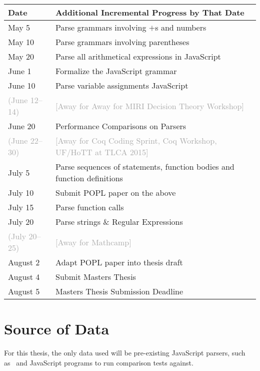 \documentclass{article}
\begin{document}
  \newcommand{\away}[1]{\textcolor{darkgray}{#1}}%
  \newcommand{\awayd}[1]{\away{(#1)}}%
  \newcommand{\awayb}[1]{\away{[Away for #1]}}%
  \begin{center}
  \begin{tabular}{l|l}
  Date & Additional Incremental Progress by That Date \\ \hline
  May 5 & Parse grammars involving $+$s and numbers \\
  May 10 & Parse grammars involving parentheses \\
  May 20 & Parse all arithmetical expressions in JavaScript \\
  June 1 & Formalize the JavaScript grammar \\
  June 10 & Parse variable assignments JavaScript \\
  \awayd{June 12--14} & \awayb{Away for MIRI Decision Theory Workshop} \\
  June 20 & Performance Comparisons on Parsers \\
  \awayd{June 22--30} & \awayb{Coq Coding Sprint, Coq Workshop, UF/HoTT at TLCA 2015} \\
  July 5 & Parse sequences of statements, function bodies and function definitions \\
  July 10 & Submit POPL paper on the above \\
  July 15 & Parse function calls \\
  July 20 & Parse strings \& Regular Expressions \\
  \awayd{July 20--25} & \awayb{Mathcamp} \\
  August 2 & Adapt POPL paper into thesis draft \\
  August 4 & Submit Masters Thesis \\
  August 5 & Masters Thesis Submission Deadline
  \end{tabular}
  \end{center}

\section{Source of Data}
  For this thesis, the only data used will be pre-existing JavaScript parsers, such as~\cite{esprima,v8}
  and JavaScript programs to run comparison tests against.

\nocite{*}


\end{document}
